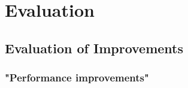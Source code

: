 \chapter{Evaluation}
\section{Evaluation of Improvements}
	\subsection{"Performance improvements"}
	\label{sec:PerformanceEvaluation}
	
	
